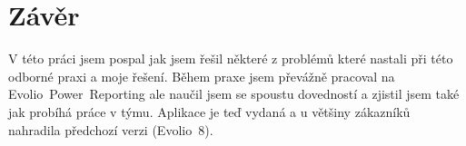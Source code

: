 \documentclass[czech,bachelorpractice,dept460,male,csharp]{diploma}
\newcommand{\EvolioEight}{Evolio~8}
\newcommand{\EFilters}{Evolio~Power~Reporting}
\begin{document}
\section{Závěr}
V této práci jsem pospal jak jsem řešil některé z problémů které nastali při této odborné praxi a moje řešení. Během praxe jsem převážně pracoval na {\EFilters} ale naučil jsem se spoustu dovedností a zjistil jsem také jak probíhá práce v týmu. Aplikace je teď vydaná a u většiny zákazníků nahradila předchozí verzi ({\EvolioEight}). 

\printbibliography[title={Literatura}, heading=bibintoc]


\end{document}
